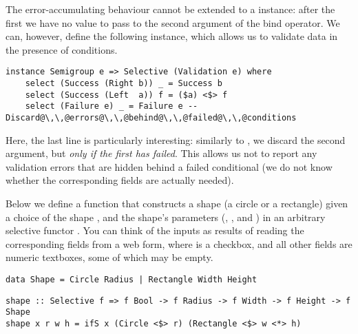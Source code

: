 {\noindent
The error-accumulating behaviour cannot be extended to a  instance:
after the first  we have no value to pass to the second argument of
the bind operator. We can, however, define the following 
instance, which allows us to validate data in the presence of conditions.

\vspace{0.5mm}
\begin{verbatim}
instance Semigroup e => Selective (Validation e) where
    select (Success (Right b)) _ = Success b
    select (Success (Left  a)) f = ($a) <$> f
    select (Failure e) _ = Failure e -- Discard@\,\,@errors@\,\,@behind@\,\,@failed@\,\,@conditions
\end{verbatim}
\vspace{0.5mm}

\noindent
Here, the last line is particularly interesting: similarly to , we
discard the second argument, but \emph{only if the first has failed}. This
allows us not to report any validation errors that are hidden behind a failed
conditional (we do not know whether the corresponding fields are actually
needed).

Below we define a function that constructs a shape (a circle or a rectangle)
given a choice of the shape , and the shape's parameters (, ,
and ) in an arbitrary selective functor . You can think of the
inputs as results of reading the corresponding fields from a web form, where
 is a checkbox, and all other fields are numeric textboxes, some of which
may be empty.

\vspace{0.5mm}
\begin{verbatim}
data Shape = Circle Radius | Rectangle Width Height
\end{verbatim}
\vspace{0mm}
\begin{verbatim}
shape :: Selective f => f Bool -> f Radius -> f Width -> f Height -> f Shape
shape x r w h = ifS x (Circle <$> r) (Rectangle <$> w <*> h)
\end{verbatim}
\vspace{0.5mm}

}

